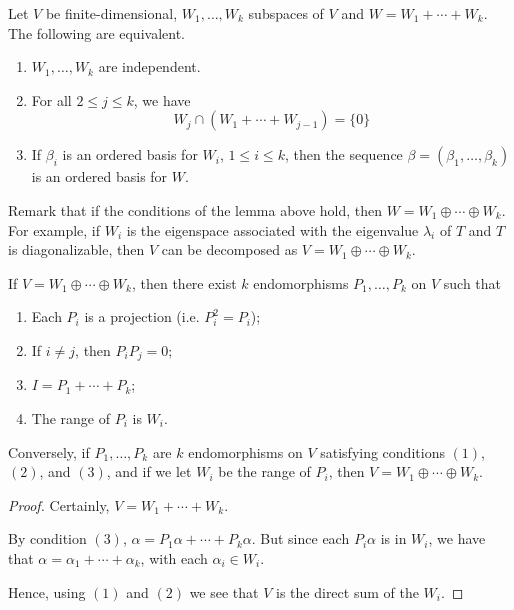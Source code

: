\begin{lemma}
	Let $V$ be finite-dimensional, $W_1, \ldots, W_k$ subspaces of $V$ and $W = W_1 + \cdots + W_k$. The following are equivalent.
	\begin{enumerate}
		\item $W_1, \ldots, W_k$ are independent.
		\item For all $2 \leq j \leq k$, we have \[ W_j \cap (W_1 + \cdots + W_{j-1}) = \{ 0 \} \]
		\item If $\beta_i$ is an ordered basis for $W_i$, $1 \leq i \leq k$, then the sequence $\beta = (\beta_1, \ldots, \beta_k)$ is an ordered basis for $W$.
	\end{enumerate}
\end{lemma}

Remark that if the conditions of the lemma above hold, then $W = W_1 \oplus \cdots \oplus W_k$. For example, if $W_i$ is the eigenspace associated with the eigenvalue $\lambda_i$ of $T$ and $T$ is diagonalizable, then $V$ can be decomposed as $V = W_1 \oplus \cdots \oplus W_k$.

\begin{theorem}\label{thm:202211101445}
	If $V = W_1 \oplus \cdots \oplus W_k$, then there exist $k$ endomorphisms $P_1, \ldots, P_k$ on $V$ such that
	\begin{enumerate}
		\item Each $P_i$ is a projection (i.e. $P_i^2 = P_i$);
		\item If $i \neq j$, then $P_i P_j = 0$;
		\item $I = P_1 + \cdots + P_k$;
		\item The range of $P_i$ is $W_i$.
	\end{enumerate}

	Conversely, if $P_1, \ldots, P_k$ are $k$ endomorphisms on $V$ satisfying conditions $(1)$, $(2)$, and $(3)$, and if we let $W_i$ be the range of $P_i$, then $V = W_1 \oplus \cdots \oplus W_k$.
\end{theorem}

\begin{proof}
	Certainly, $V = W_1 + \cdots + W_k$. 

	By condition $(3)$, $\alpha = P_1 \alpha + \cdots + P_k \alpha$. But since each $P_i \alpha$ is in $W_i$, we have that $\alpha = \alpha_1 + \cdots + \alpha_k$, with each $\alpha_i \in W_i$. 

	Hence, using $(1)$ and $(2)$ we see that $V$ is the direct sum of the $W_i$.
\end{proof}

